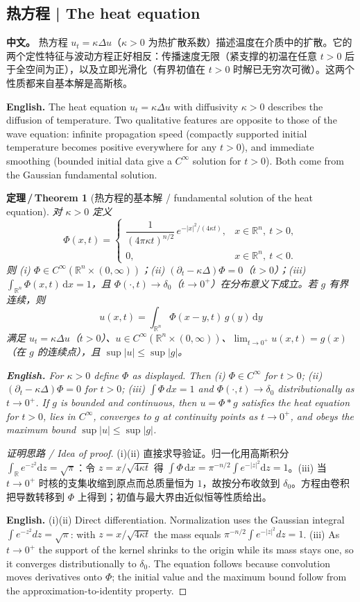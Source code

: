 \documentclass[UTF8,11pt,a4paper]{ctexart}
\newcommand{\APS}[2]{\par\noindent\textbf{中文。} #1\par\noindent\textbf{English.} #2\par\smallskip}
\newcommand{\EN}[1]{\par\noindent \textbf{English.} #1\par}
\newtheorem{theorem}[definition]{定理\,/\,Theorem}
\newcommand{\R}{\mathbb{R}}
\newcommand{\dd}{\mathrm{d}}
\begin{document}
\subsection{热方程 | The heat equation}
\APS{热方程 $u_t=\kappa\Delta u$（$\kappa>0$ 为热扩散系数）描述温度在介质中的扩散。它的两个定性特征与波动方程正好相反：传播速度无限（紧支撑的初温在任意 $t>0$ 后于全空间为正），以及立即光滑化（有界初值在 $t>0$ 时解已无穷次可微）。这两个性质都来自基本解是高斯核。}{The heat equation $u_t=\kappa\Delta u$ with diffusivity $\kappa>0$ describes the diffusion of temperature. Two qualitative features are opposite to those of the wave equation: infinite propagation speed (compactly supported initial temperature becomes positive everywhere for any $t>0$), and immediate smoothing (bounded initial data give a $C^\infty$ solution for $t>0$). Both come from the Gaussian fundamental solution.}

\begin{theorem}[热方程的基本解 / fundamental solution of the heat equation]\label{thm:heatkernel}
对 $\kappa>0$ 定义
\[
\Phi(x,t)=\begin{cases}
\dfrac{1}{(4\pi\kappa t)^{n/2}}\,e^{-|x|^2/(4\kappa t)}, & x\in\R^n,\ t>0,\\[6pt]
0, & x\in\R^n,\ t<0 .
\end{cases}
\]
则 (i) $\Phi\in C^\infty(\R^n\times(0,\infty))$；(ii) $(\partial_t-\kappa\Delta)\Phi=0$（$t>0$）；(iii) $\int_{\R^n}\Phi(x,t)\,\dd x=1$，且 $\Phi(\cdot,t)\to\delta_0$（$t\to0^+$）在分布意义下成立。若 $g$ 有界连续，则
\[
u(x,t)=\int_{\R^n}\Phi(x-y,t)\,g(y)\,\dd y
\]
满足 $u_t=\kappa\Delta u$（$t>0$）、$u\in C^\infty(\R^n\times(0,\infty))$、$\lim_{t\to0^+}u(x,t)=g(x)$（在 $g$ 的连续点），且 $\sup|u|\le\sup|g|$。
\EN{For $\kappa>0$ define $\Phi$ as displayed. Then (i) $\Phi\in C^\infty$ for $t>0$; (ii) $(\partial_t-\kappa\Delta)\Phi=0$ for $t>0$; (iii) $\int\Phi\,dx=1$ and $\Phi(\cdot,t)\to\delta_0$ distributionally as $t\to0^+$. If $g$ is bounded and continuous, then $u=\Phi*g$ satisfies the heat equation for $t>0$, lies in $C^\infty$, converges to $g$ at continuity points as $t\to0^+$, and obeys the maximum bound $\sup|u|\le\sup|g|$.}
\end{theorem}

\begin{proof}[证明思路 / Idea of proof]
(i)(ii) 直接求导验证。归一化用高斯积分 $\int_\R e^{-z^2}\dd z=\sqrt\pi$：令 $z=x/\sqrt{4\kappa t}$ 得 $\int\Phi\,\dd x=\pi^{-n/2}\int e^{-|z|^2}\dd z=1$。(iii) 当 $t\to0^+$ 时核的支集收缩到原点而总质量恒为 $1$，故按分布收敛到 $\delta_0$。方程由卷积把导数转移到 $\Phi$ 上得到；初值与最大界由近似恒等性质给出。\EN{(i)(ii) Direct differentiation. Normalization uses the Gaussian integral $\int e^{-z^2}dz=\sqrt\pi$: with $z=x/\sqrt{4\kappa t}$ the mass equals $\pi^{-n/2}\int e^{-|z|^2}dz=1$. (iii) As $t\to0^+$ the support of the kernel shrinks to the origin while its mass stays one, so it converges distributionally to $\delta_0$. The equation follows because convolution moves derivatives onto $\Phi$; the initial value and the maximum bound follow from the approximation-to-identity property.}
\end{proof}
\end{document}
